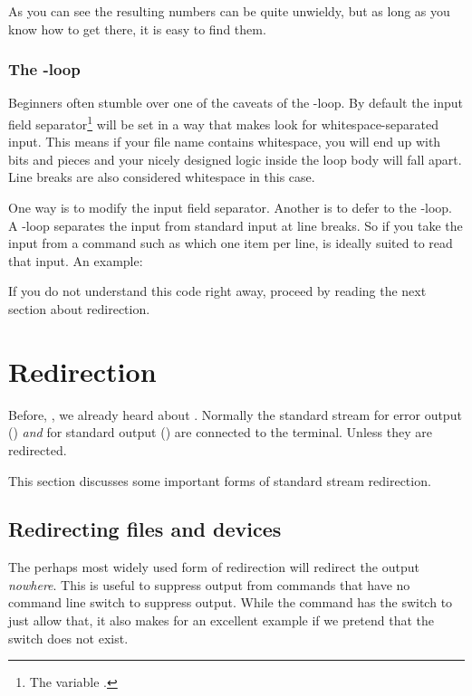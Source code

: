 \documentclass{olli-handout}
\begin{document}
As you can see the resulting numbers can be quite unwieldy, but as long as you know how to get there, it is easy to find them.

\subsubsection{The -loop}

Beginners often stumble over one of the caveats of the -loop. By default the input field separator\footnote{The variable .} will be set in a way that makes  look for whitespace-separated input. This means if your file name contains whitespace, you will end up with bits and pieces and your nicely designed logic inside the loop body will fall apart. Line breaks are also considered whitespace in this case.

One way is to modify the input field separator. Another is to defer to the -loop. A -loop separates the input from standard input at line breaks. So if you take the input from a command such as  which one item per line,  is ideally suited to read that input. An example:


If you do not understand this code right away, proceed by reading the next section about redirection.

\section{Redirection}

Before, , we already heard about . Normally the standard stream for error output () \emph{and} for standard output () are connected to the terminal. Unless they are redirected.

This section discusses some important forms of standard stream redirection.

\subsection{Redirecting files and devices}

The perhaps most widely used form of redirection will redirect the output \emph{nowhere}. This is useful to suppress output from commands that have no command line switch to suppress output. While the  command has the  switch to just allow that, it also makes for an excellent example if we pretend that the switch does not exist.
\end{document}
